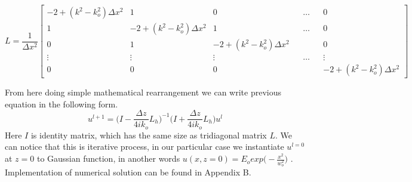\documentclass[a4paper]{article}
\begin{document}
	\setlength\arraycolsep{-4.5pt}
	\[ L = \frac{1}{\Delta x^2}\begin{bmatrix}
    -2+(k^2-k_o^2)\Delta x^2& 1& 0& &\dots& & 0 \\
    1 & -2+(k^2-k_o^2)\Delta x^2 & 1& &\dots& & 0 \\
    0 &     1& -2+(k^2-k_o^2)\Delta x^2 & & & & 0 \\
    \vdots & \vdots & \vdots & &\dots& & \vdots \\
    0& 0& 0& && &     -2+(k^2-k_o^2)\Delta x^2
	\end{bmatrix}\]
	
	
	\noindent From here doing simple mathematical rearrangement we can write previous equation in the following form.
		\[u^{l+1} = \bigg(I-\frac{\Delta z}{4ik_o}L_h\bigg)^{-1}\bigg(I+\frac{\Delta z}{4ik_o}L_h\bigg) u^l\]
	Here $I$ is identity matrix, which has the same size as tridiagonal matrix $L$. We can notice that this is iterative process, in our particular case we instantiate $u^{l=0}$ at $z = 0$ to Gaussian function, in another words $u(x,z=0)= E_oexp\big(-\frac{x^2}{w_o^2}\big)$ \cite{pedrola2015beam, link2}. Implementation of numerical solution can be found in Appendix B.
	
\end{document}
